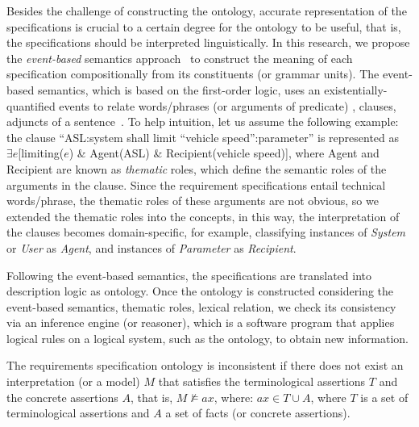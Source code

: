 Besides the challenge of constructing the ontology, accurate representation of the specifications is crucial to a certain degree for the ontology to be useful, that is, the specifications should be interpreted linguistically. In this research, we propose the \textit{event-based} semantics approach~\cite{Mahmud2017SpecificationLogic} to construct the meaning of each specification compositionally from its constituents (or grammar units). The event-based semantics, which is based on the first-order logic, uses an existentially-quantified events to relate words/phrases (or arguments of predicate) , clauses, adjuncts of a sentence~\cite{Mahmud2017SpecificationLogic}. To help intuition, let us assume the following example: the clause ``ASL:system shall limit ``vehicle speed'':parameter'' is represented as $\exists e$[limiting($e$) \& Agent(ASL) \& Recipient(vehicle speed)], where Agent and Recipient are known as \textit{thematic} roles, which define the semantic roles of the arguments in the clause.  Since the requirement specifications entail technical words/phrase, the thematic roles of these arguments are not obvious, so we extended the thematic roles into the \resa{} concepts, in this way, the interpretation of the clauses becomes domain-specific, for example, classifying instances of \textit{System} or \textit{User} as \textit{Agent}, and  instances of \textit{Parameter} as \textit{Recipient}.  

Following the event-based semantics, the \resa{} specifications are translated into description logic as ontology. Once the ontology is constructed considering the event-based semantics, thematic roles, lexical relation, we check its consistency via an inference engine (or reasoner), which is a software program that applies logical rules on a logical system, such as the ontology, to obtain new information.
\begin{definition}
	The requirements specification ontology is inconsistent if there does not exist an interpretation (or a model) $M$ that satisfies the terminological assertions $T$ and the concrete assertions $A$, that is, $M \not\models ax$, where: $ax \in T \cup A$, where $T$ is a set of terminological assertions and $A$  a set of facts (or concrete assertions).
\end{definition}

